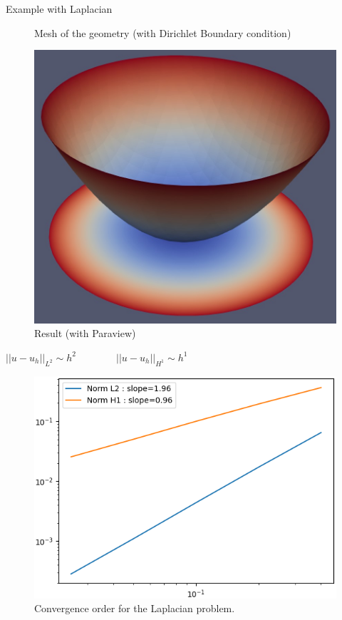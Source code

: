 \begin{frame}[allowframebreaks]{Example with Laplacian}
\begin{minipage}{0.31\linewidth}
\begin{figure}
			\caption{Mesh of the geometry (with Dirichlet Boundary condition)}
		\end{figure}
	\end{minipage} \quad
	\begin{minipage}{0.31\linewidth}
		\begin{figure}
			\includegraphics[width=\linewidth]{"images/parareal/circle_result.jpg"}
			\caption{Result (with Paraview)}
		\end{figure}	
	\end{minipage}

	\newpage
	\centering
	$||u-u_h||_{L^2}\sim h^2 \qquad \qquad ||u-u_h||_{H^1}\sim h^1 $
	\begin{figure}
		\includegraphics[width=0.52\linewidth]{"images/parareal/cvg_laplacian.png"}
		\caption{Convergence order for the Laplacian problem.}
	\end{figure}
\end{frame}

